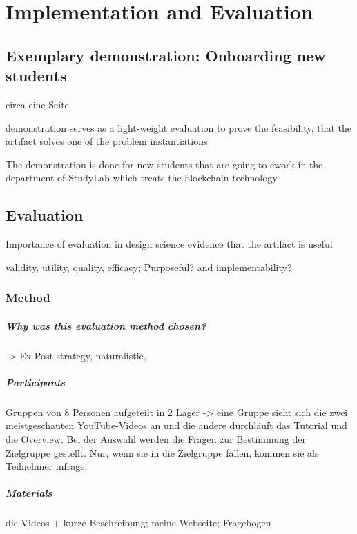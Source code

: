 \chapter{Implementation and Evaluation}

\section{Exemplary demonstration: Onboarding new students} \label{sec:demo}
circa eine Seite

demonstration serves as a light-weight evaluation to prove the feasibility, that the artifact solves one of the problem instantiations

The demonstration is done for new students that are going to ework in the department of StudyLab which treats the blockchain technology. 

\section{Evaluation} \label{sec:Evaluation}

Importance of evaluation in design science 
evidence that the artifact is useful

validity, utility, quality, efficacy; Purposeful? and implementability?

\subsection{Method} \label{subsec:EvaluationMethod}

\paragraph{Why was this evaluation method chosen?} -> Ex-Post strategy, naturalistic, 
\cite{PfeffersDesignScienceResearch2012} \cite{Pries-HejeComprehensiveFrameworkEvaluation2012} \cite{Pries-HejeStrategiesDesignScience}

\paragraph{Participants}
Gruppen von 8 Personen aufgeteilt in 2 Lager -> eine Gruppe sieht sich die zwei meistgeschauten YouTube-Videos an und die andere durchläuft das Tutorial und die Overview.
Bei der Auswahl werden die Fragen zur Bestimmung der Zielgruppe gestellt. Nur, wenn sie in die Zielgruppe fallen, kommen sie als Teilnehmer infrage.

\paragraph{Materials}
die Videos + kurze Beschreibung;
meine Webseite;
Fragebogen
